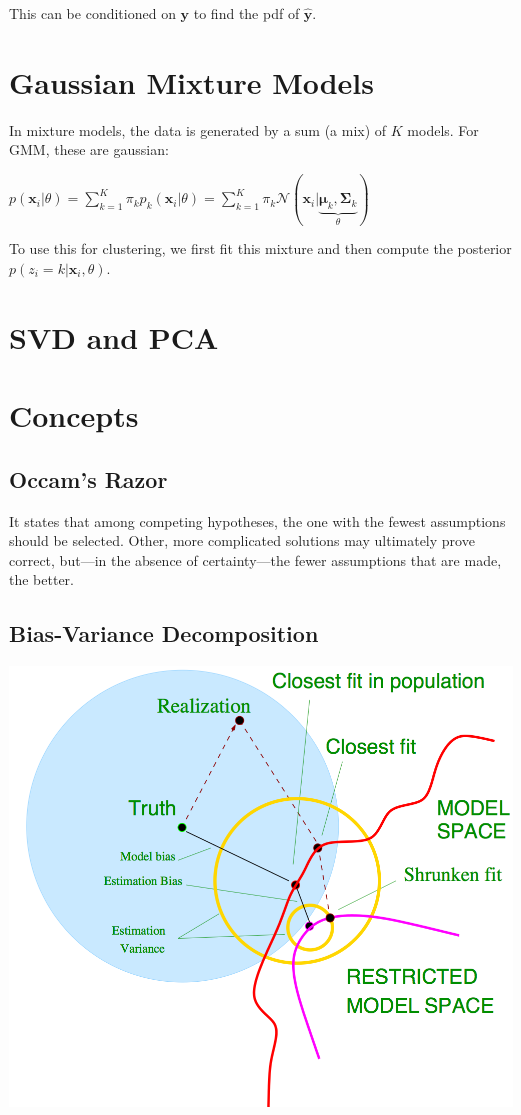\documentclass[10pt,a4paper,landscape]{article}
\providecommand{\bf}[1]{\ensuremath{\mathbf{#1}}}
\begin{document}
\begin{multicols*}{4}
This can be conditioned on $\bf{y}$ to find the pdf of $\bf{\hat{y}}$.

\section{Gaussian Mixture Models}
In mixture models, the data is generated by a sum (a mix) of $K$ models. For GMM, these are gaussian:

$p(\bf{x}_i | \theta) = \sum_{k=1}^K \pi_k p_k(\bf{x}_i | \theta) =  \sum_{k=1}^K \pi_k \mathcal{N}(\bf{x}_i | \underbrace{\bf{\mu}_k, \bf{\Sigma}_k}_{\theta})$

To use this for clustering, we first fit this mixture and then compute the posterior $p(z_i = k | \bf{x}_i, \theta)$.

\section{SVD and PCA}

\section{Concepts}
\subsection{Occam's Razor}
It states that among competing hypotheses, the one with the fewest assumptions should be selected. Other, more complicated solutions may ultimately prove correct, but—in the absence of certainty—the fewer assumptions that are made, the better.

\subsection{Bias-Variance Decomposition}
\begin{colfig}
  \centering
  \includegraphics[width=\linewidth]{images/bias-variance.png}
\end{colfig}


\end{multicols*}
\end{document}
